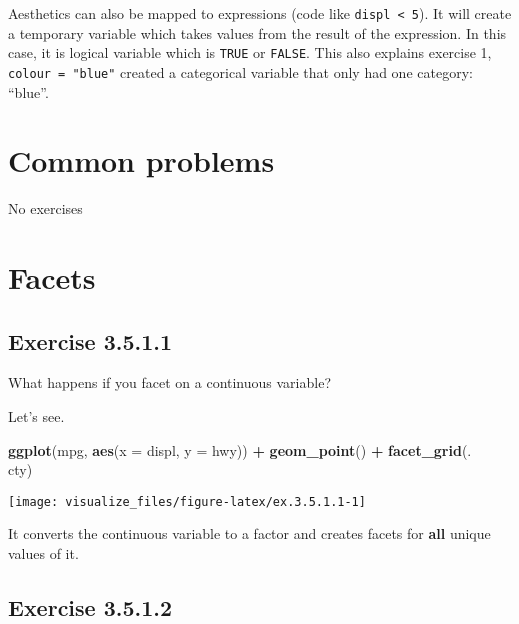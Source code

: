 \documentclass[]{book}
\newenvironment{Shaded}{\begin{snugshade}}{\end{snugshade}}
\newcommand{\DataTypeTok}[1]{\textcolor[rgb]{0.13,0.29,0.53}{#1}}
\newcommand{\KeywordTok}[1]{\textcolor[rgb]{0.13,0.29,0.53}{\textbf{#1}}}
\newcommand{\NormalTok}[1]{#1}
\newcommand{\OperatorTok}[1]{\textcolor[rgb]{0.81,0.36,0.00}{\textbf{#1}}}
\newcommand{\StringTok}[1]{\textcolor[rgb]{0.31,0.60,0.02}{#1}}
\theoremstyle{plain}
\theoremstyle{remark}
\begin{document}
Aesthetics can also be mapped to expressions (code like
\texttt{displ\ \textless{}\ 5}). It will create a temporary variable
which takes values from the result of the expression. In this case, it
is logical variable which is \texttt{TRUE} or \texttt{FALSE}. This also
explains exercise 1, \texttt{colour\ =\ "blue"} created a categorical
variable that only had one category: ``blue''.

\hypertarget{common-problems}{%
\section{Common problems}\label{common-problems}}

No exercises

\hypertarget{facets}{%
\section{Facets}\label{facets}}

\hypertarget{exercise-3.5.1.1}{%
\subsection*{\texorpdfstring{Exercise
{3.5.1.1}}{Exercise 3.5.1.1}}\label{exercise-3.5.1.1}}

What happens if you facet on a continuous variable?

Let's see.

\begin{Shaded}
\begin{Highlighting}[]
\KeywordTok{ggplot}\NormalTok{(mpg, }\KeywordTok{aes}\NormalTok{(}\DataTypeTok{x =}\NormalTok{ displ, }\DataTypeTok{y =}\NormalTok{ hwy)) }\OperatorTok{+}
\StringTok{  }\KeywordTok{geom_point}\NormalTok{() }\OperatorTok{+}
\StringTok{  }\KeywordTok{facet_grid}\NormalTok{(. }\OperatorTok{~}\StringTok{ }\NormalTok{cty)}
\end{Highlighting}
\end{Shaded}

\begin{center}\texttt{[image: visualize\_files/figure-latex/ex.3.5.1.1-1]} \end{center}

It converts the continuous variable to a factor and creates facets for
\textbf{all} unique values of it.

\hypertarget{exercise-3.5.1.2}{%
\subsection*{\texorpdfstring{Exercise
{3.5.1.2}}{Exercise 3.5.1.2}}\label{exercise-3.5.1.2}}
\end{document}
